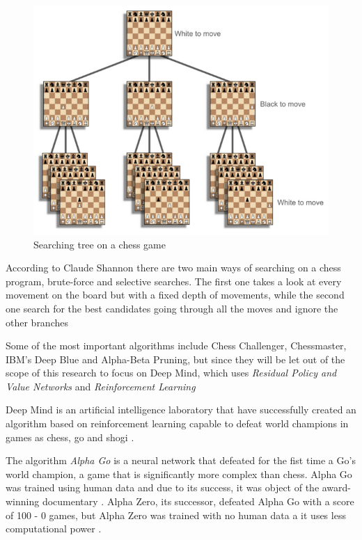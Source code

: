 \documentclass[conference]{IEEEtran}
\begin{document}
\begin{figure}[h]
\centering
\includegraphics[scale=0.52]{img/tree}
\caption{Searching tree on a chess game \cite{how}}
\label{chess:tree}
\end{figure}

According to Claude Shannon there are two main ways of searching on a chess program, brute-force and selective searches. The first one takes a look at every movement on the board but with a fixed depth of movements, while the second one search for the best candidates going through all the moves and ignore the other branches \cite{how}

Some of the most important algorithms include Chess Challenger, Chessmaster, IBM’s Deep Blue and Alpha-Beta Pruning, but since they will be let out of the scope of this research to focus on Deep Mind, which uses \textit{Residual Policy and Value Networks} and \textit{Reinforcement Learning}

Deep Mind is an artificial intelligence laboratory that have successfully created an algorithm based on reinforcement learning capable to defeat world champions in games as chess, go and shogi \cite{how}.

The algorithm \textit{Alpha Go} is a neural network that defeated for the fist time a Go's world champion, a game that is significantly more complex than chess. Alpha Go was trained using human data and due to its success, it was object of the award-winning documentary \cite{how}. Alpha Zero, its successor, defeated Alpha Go with a score of 100 - 0 games, but Alpha Zero was trained with no human data a it uses less computational power \cite{how}.
\end{document}
